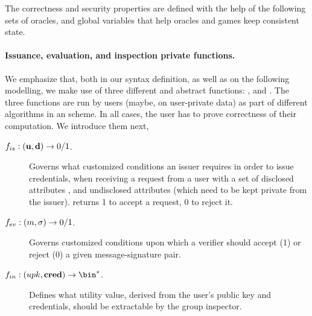 The correctness and security properties are defined with the help of the
following sets of oracles, and global variables that help oracles and games
keep consistent state.

\paragraph{Issuance, evaluation, and inspection private functions.} %
We emphasize that, both in our syntax definition, as well as on the following
modelling, we make use of three different and abstract functions: \fissue,
\feval and \finsp. The three functions are run by users (maybe, on user-private
data) as part of different algorithms in an \UAS scheme. In all cases, the
user has to prove correctness of their computation. We introduce them next,

\begin{description}
\item[$f_{is}: (\mathbf{u},\mathbf{d}) \rightarrow 0/1$.] Governs what customized
  conditions an issuer requires in order to issue credentials, when receiving
  a request from a user with a set of disclosed attributes \dattrs, and
  undisclosed attributes \uattrs (which need to be kept private from the
  issuer). \fissue returns 1 to accept a request, 0 to reject it.  
\item[$f_{ev}: (m,\sigma) \rightarrow 0/1$.] Governs customized conditions upon
  which a verifier should accept (1) or reject (0) a given message-signature
  pair.
\item[$\finsp: (\upk,\scred) \rightarrow \bin^*$.] Defines what utility value,
  derived from the user's public key and credentials, should be extractable by
  the group inspector.
\end{description}

